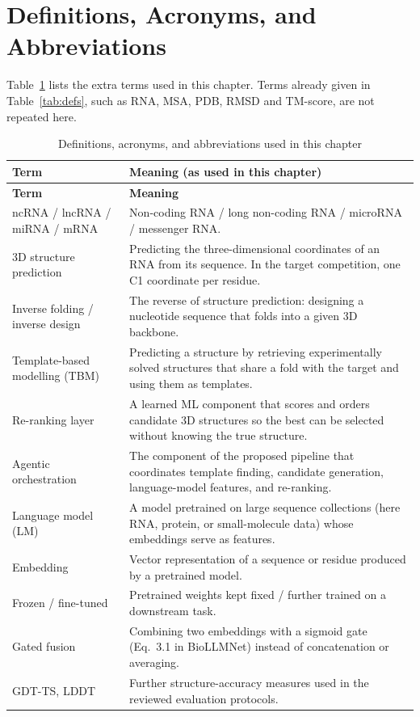 \documentclass{FastFyp}
\begin{document}
\section{Definitions, Acronyms, and Abbreviations}
Table~\ref{tab:litdefs} lists the extra terms used in this chapter. Terms already given in Table~\ref{tab:defs}, such as RNA, MSA, PDB, RMSD and TM-score, are not repeated here.
\begin{longtable}{p{} p{}}
\caption{Definitions, acronyms, and abbreviations used in this chapter}\label{tab:litdefs}\\
\hline
\textbf{Term} & \textbf{Meaning (as used in this chapter)}\\
\hline
\endfirsthead
\hline
\textbf{Term} & \textbf{Meaning}\\
\hline
\endhead
ncRNA / lncRNA / miRNA / mRNA & Non-coding RNA / long non-coding RNA / microRNA / messenger RNA.\\
3D structure prediction & Predicting the three-dimensional coordinates of an RNA from its sequence. In the target competition, one C1 coordinate per residue.\\
Inverse folding / inverse design & The reverse of structure prediction: designing a nucleotide sequence that folds into a given 3D backbone.\\
Template-based modelling (TBM) & Predicting a structure by retrieving experimentally solved structures that share a fold with the target and using them as templates.\\
Re-ranking layer & A learned ML component that scores and orders candidate 3D structures so the best can be selected without knowing the true structure.\\
Agentic orchestration & The component of the proposed pipeline that coordinates template finding, candidate generation, language-model features, and re-ranking.\\
Language model (LM) & A model pretrained on large sequence collections (here RNA, protein, or small-molecule data) whose embeddings serve as features.\\
Embedding & Vector representation of a sequence or residue produced by a pretrained model.\\
Frozen / fine-tuned & Pretrained weights kept fixed / further trained on a downstream task.\\
Gated fusion & Combining two embeddings with a sigmoid gate (Eq.~3.1 in BioLLMNet) instead of concatenation or averaging.\\
GDT-TS, LDDT & Further structure-accuracy measures used in the reviewed evaluation protocols.\\

\end{longtable}
\end{document}
